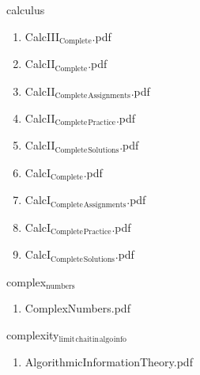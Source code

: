 \documentclass[11pt]{article}
\begin{document}

\item calculus
\label{sec-1-1-1-1-29-25}
\begin{enumerate}
\item CalcIII$_{\text{Complete}}$.pdf
\label{sec-1-1-1-1-29-25-1}

\item CalcII$_{\text{Complete}}$.pdf
\label{sec-1-1-1-1-29-25-2}

\item CalcII$_{\text{Complete}}$$_{\text{Assignments}}$.pdf
\label{sec-1-1-1-1-29-25-3}

\item CalcII$_{\text{Complete}}$$_{\text{Practice}}$.pdf
\label{sec-1-1-1-1-29-25-4}

\item CalcII$_{\text{Complete}}$$_{\text{Solutions}}$.pdf
\label{sec-1-1-1-1-29-25-5}

\item CalcI$_{\text{Complete}}$.pdf
\label{sec-1-1-1-1-29-25-6}

\item CalcI$_{\text{Complete}}$$_{\text{Assignments}}$.pdf
\label{sec-1-1-1-1-29-25-7}

\item CalcI$_{\text{Complete}}$$_{\text{Practice}}$.pdf
\label{sec-1-1-1-1-29-25-8}

\item CalcI$_{\text{Complete}}$$_{\text{Solutions}}$.pdf
\label{sec-1-1-1-1-29-25-9}
\end{enumerate}

\item complex$_{\text{numbers}}$
\label{sec-1-1-1-1-29-26}
\begin{enumerate}
\item ComplexNumbers.pdf
\label{sec-1-1-1-1-29-26-1}
\end{enumerate}

\item complexity$_{\text{limit}}$$_{\text{chaitin}}$$_{\text{algo}}$$_{\text{info}}$
\label{sec-1-1-1-1-29-27}
\begin{enumerate}
\item AlgorithmicInformationTheory.pdf
\label{sec-1-1-1-1-29-27-1}


\end{enumerate}
\end{document}
